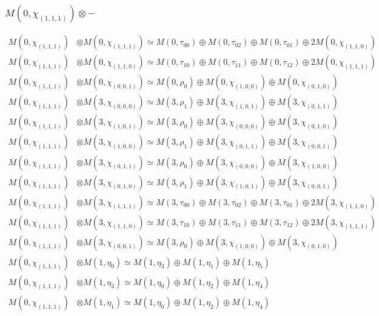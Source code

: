 \subsubsection{$ M(0,\chi_{(1,1,1)})\otimes -$}
\begin{align*}
M(0,\chi_{(1,1,1)}) &\otimes M(0,\chi_{(1,1,1)}) \simeq M(0,\tau_{00}) \oplus M(0,\tau_{02}) \oplus M(0,\tau_{01}) \oplus 2 M(0,\chi_{(1,1,0)})\\
M(0,\chi_{(1,1,1)}) &\otimes M(0,\chi_{(1,1,0)}) \simeq M(0,\tau_{10}) \oplus M(0,\tau_{11}) \oplus M(0,\tau_{12}) \oplus 2 M(0,\chi_{(1,1,1)})\\
M(0,\chi_{(1,1,1)}) &\otimes M(0,\chi_{(0,0,1)}) \simeq M(0,\rho_{0}) \oplus M(0,\chi_{(1,0,0)}) \oplus M(0,\chi_{(0,1,0)})\\
M(0,\chi_{(1,1,1)}) &\otimes M(3,\chi_{(0,0,0)}) \simeq M(3,\rho_{1}) \oplus M(3,\chi_{(1,0,1)}) \oplus M(3,\chi_{(0,1,1)})\\
M(0,\chi_{(1,1,1)}) &\otimes M(3,\chi_{(1,0,1)}) \simeq M(3,\rho_{0}) \oplus M(3,\chi_{(0,0,0)}) \oplus M(3,\chi_{(0,1,0)})\\
M(0,\chi_{(1,1,1)}) &\otimes M(3,\chi_{(1,0,0)}) \simeq M(3,\rho_{1}) \oplus M(3,\chi_{(0,1,1)}) \oplus M(3,\chi_{(0,0,1)})\\
M(0,\chi_{(1,1,1)}) &\otimes M(3,\chi_{(0,1,1)}) \simeq M(3,\rho_{0}) \oplus M(3,\chi_{(0,0,0)}) \oplus M(3,\chi_{(1,0,0)})\\
M(0,\chi_{(1,1,1)}) &\otimes M(3,\chi_{(0,1,0)}) \simeq M(3,\rho_{1}) \oplus M(3,\chi_{(1,0,1)}) \oplus M(3,\chi_{(0,0,1)})\\
M(0,\chi_{(1,1,1)}) &\otimes M(3,\chi_{(1,1,1)}) \simeq M(3,\tau_{00}) \oplus M(3,\tau_{02}) \oplus M(3,\tau_{01}) \oplus 2 M(3,\chi_{(1,1,0)})\\
M(0,\chi_{(1,1,1)}) &\otimes M(3,\chi_{(1,1,0)}) \simeq M(3,\tau_{10}) \oplus M(3,\tau_{11}) \oplus M(3,\tau_{12}) \oplus 2 M(3,\chi_{(1,1,1)})\\
M(0,\chi_{(1,1,1)}) &\otimes M(3,\chi_{(0,0,1)}) \simeq M(3,\rho_{0}) \oplus M(3,\chi_{(1,0,0)}) \oplus M(3,\chi_{(0,1,0)})\\
M(0,\chi_{(1,1,1)}) &\otimes M(1,\eta_{0}) \simeq M(1,\eta_{3}) \oplus M(1,\eta_{1}) \oplus M(1,\eta_{5})\\
M(0,\chi_{(1,1,1)}) &\otimes M(1,\eta_{3}) \simeq M(1,\eta_{0}) \oplus M(1,\eta_{2}) \oplus M(1,\eta_{4})\\
M(0,\chi_{(1,1,1)}) &\otimes M(1,\eta_{1}) \simeq M(1,\eta_{0}) \oplus M(1,\eta_{2}) \oplus M(1,\eta_{4})\\

\end{align*}
